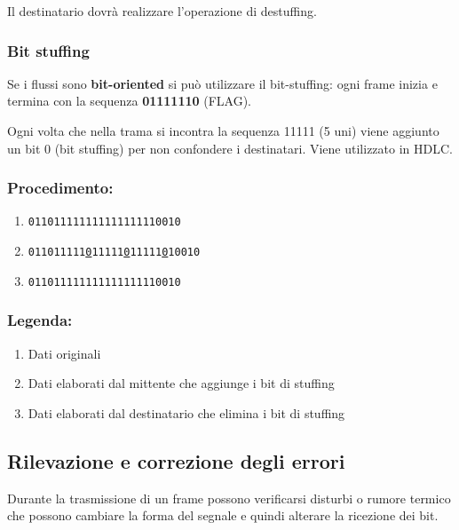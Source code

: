             Il destinatario dovrà realizzare l'operazione di destuffing.

        \subsubsection{Bit stuffing}
            Se i flussi sono \textbf{bit-oriented} si può utilizzare il bit-stuffing: ogni frame inizia e termina con la sequenza \textbf{01111110} (FLAG).

            Ogni volta che nella trama si incontra la sequenza 11111 (5 uni) viene aggiunto un bit 0 (bit stuffing) per non confondere i destinatari. Viene utilizzato in HDLC.
            
            \subsubsection*{Procedimento:}
            \begin{enumerate}[label=(\alph*)]
                \item \texttt{011011111111111111110010}
                \item \texttt{011011111\underline{0}11111\underline{0}11111\underline{0}10010}
                \item \texttt{011011111111111111110010}
            \end{enumerate}

            \subsubsection*{Legenda:}
            \begin{enumerate}[label=(\alph*)]
                \item Dati originali
                \item Dati elaborati dal mittente che aggiunge i bit di stuffing
                \item Dati elaborati dal destinatario che elimina i bit di stuffing
            \end{enumerate}

    \subsection{Rilevazione e correzione degli errori}
        Durante la trasmissione di un frame possono verificarsi disturbi o rumore termico che possono cambiare la forma del segnale e quindi alterare la ricezione dei bit.

